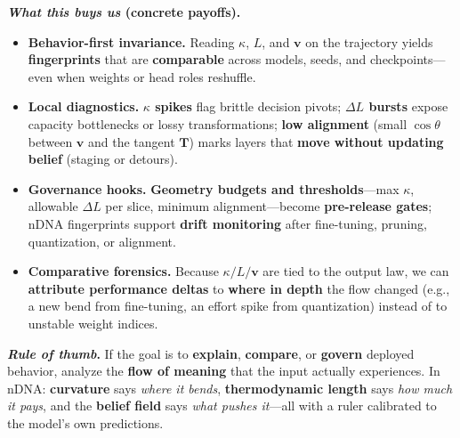 \documentclass[11pt]{article}
\begin{document}
\medskip
\noindent\textbf{\emph{What this buys us} (concrete payoffs).}
\begin{itemize}[leftmargin=*,itemsep=0.4em]
  \item \textbf{Behavior-first invariance.} Reading $\kappa$, $L$, and $\mathbf{v}$ on the trajectory yields \textbf{fingerprints} that are \textbf{comparable} across models, seeds, and checkpoints---even when weights or head roles reshuffle.
  \item \textbf{Local diagnostics.} \textbf{$\kappa$ spikes} flag brittle decision pivots; \textbf{$\Delta L$ bursts} expose capacity bottlenecks or lossy transformations; \textbf{low alignment} (small $\cos\theta$ between $\mathbf{v}$ and the tangent $\mathbf{T}$) marks layers that \textbf{move without updating belief} (staging or detours).
  \item \textbf{Governance hooks.} \textbf{Geometry budgets and thresholds}---max $\kappa$, allowable $\Delta L$ per slice, minimum alignment---become \textbf{pre-release gates}; nDNA fingerprints support \textbf{drift monitoring} after fine-tuning, pruning, quantization, or alignment.
  \item \textbf{Comparative forensics.} Because $\kappa/L/\mathbf{v}$ are tied to the output law, we can \textbf{attribute performance deltas} to \textbf{where in depth} the flow changed (e.g., a new bend from fine-tuning, an effort spike from quantization) instead of to unstable weight indices.
\end{itemize}

\medskip
\noindent\textbf{\emph{Rule of thumb}.}
If the goal is to \textbf{explain}, \textbf{compare}, or \textbf{govern} deployed behavior, analyze the \textbf{flow of meaning} that the input actually experiences. In nDNA: \textbf{curvature} says \emph{where it bends}, \textbf{thermodynamic length} says \emph{how much it pays}, and the \textbf{belief field} says \emph{what pushes it}---all with a ruler calibrated to the model's own predictions.









\setlength{\panelht}{0.27\textheight} %
\end{document}
